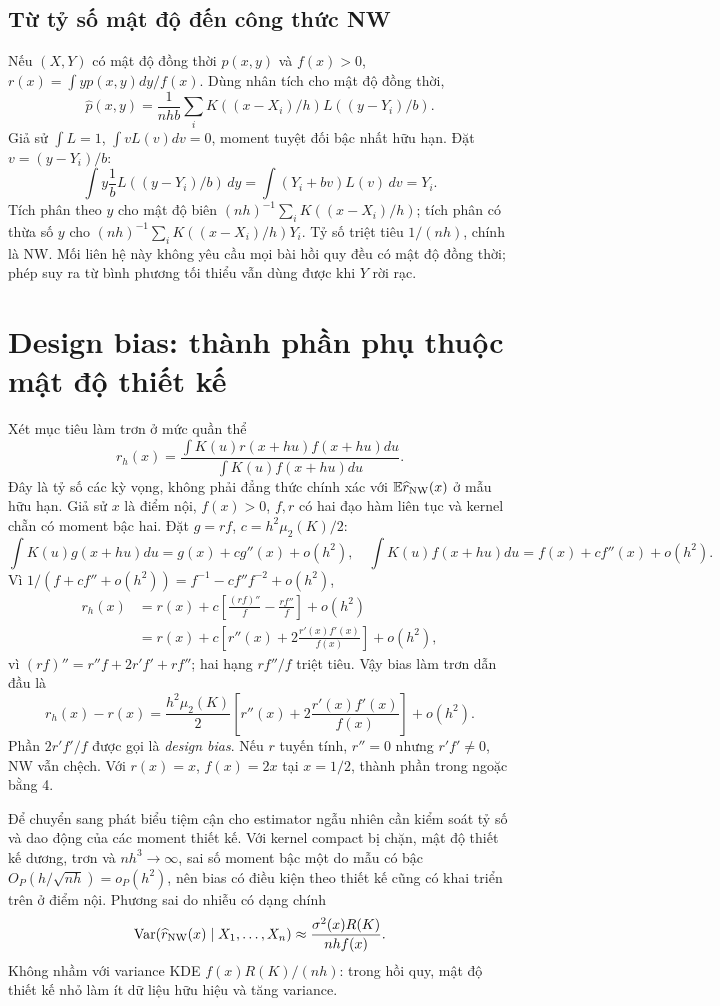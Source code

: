 \subsection{Từ tỷ số mật độ đến công thức NW}
Nếu $(X,Y)$ có mật độ đồng thời $p(x,y)$ và $f(x)>0$,
$r(x)=\int yp(x,y)dy/f(x)$.
Dùng nhân tích cho mật độ đồng thời,
\[
\widehat p(x,y)=\frac1{nhb}\sum_iK((x-X_i)/h)L((y-Y_i)/b).
\]
Giả sử $\int L=1$, $\int vL(v)dv=0$, moment tuyệt đối bậc nhất hữu hạn.
Đặt $v=(y-Y_i)/b$:
\[
\int y\frac1bL((y-Y_i)/b)\,dy
=\int(Y_i+bv)L(v)\,dv=Y_i.
\]
Tích phân theo $y$ cho mật độ biên
$(nh)^{-1}\sum_iK((x-X_i)/h)$; tích phân có thừa số $y$ cho
$(nh)^{-1}\sum_iK((x-X_i)/h)Y_i$. Tỷ số triệt tiêu $1/(nh)$, chính
là NW. Mối liên hệ này không yêu cầu mọi bài hồi quy đều có mật độ
đồng thời; phép suy ra từ bình phương tối thiểu vẫn dùng được khi $Y$ rời rạc.

\section{Design bias: thành phần phụ thuộc mật độ thiết kế}
Xét mục tiêu làm trơn ở mức quần thể
\[
r_h(x)=\frac{\int K(u)r(x+hu)f(x+hu)du}
{\int K(u)f(x+hu)du}.
\]
Đây là tỷ số các kỳ vọng, không phải đẳng thức chính xác với
$\mathbb E\widehat r_{\rm NW}(x)$ ở mẫu hữu hạn.
Giả sử $x$ là điểm nội, $f(x)>0$, $f,r$ có hai đạo hàm liên tục và
kernel chẵn có moment bậc hai. Đặt $g=rf$, $c=h^2\mu_2(K)/2$:
\[
\int K(u)g(x+hu)du=g(x)+cg''(x)+o(h^2),\quad
\int K(u)f(x+hu)du=f(x)+cf''(x)+o(h^2).
\]
Vì $1/(f+c f''+o(h^2))=f^{-1}-cf''f^{-2}+o(h^2)$,
\begin{align*}
r_h(x)&=r(x)+c\left[\frac{(rf)''}{f}-\frac{r f''}{f}\right]+o(h^2)\\
&=r(x)+c\left[r''(x)+2\frac{r'(x)f'(x)}{f(x)}\right]+o(h^2),
\end{align*}
vì $(rf)''=r''f+2r'f'+rf''$; hai hạng $rf''/f$ triệt tiêu.
Vậy bias làm trơn dẫn đầu là
\[
\boxed{r_h(x)-r(x)=\frac{h^2\mu_2(K)}2
\left[r''(x)+2\frac{r'(x)f'(x)}{f(x)}\right]+o(h^2).}
\]
Phần $2r'f'/f$ được gọi là \emph{design bias}.
Nếu $r$ tuyến tính, $r''=0$ nhưng $r'f'\ne0$, NW vẫn chệch.
Với $r(x)=x$, $f(x)=2x$ tại $x=1/2$, thành phần trong ngoặc bằng 4.

Để chuyển sang phát biểu tiệm cận cho estimator ngẫu nhiên cần kiểm soát
tỷ số và dao động của các moment thiết kế. Với kernel compact bị chặn,
mật độ thiết kế dương, trơn và $nh^3\to\infty$, sai số moment bậc một
do mẫu có bậc $O_P(h/\sqrt{nh})=o_P(h^2)$, nên bias có điều kiện
theo thiết kế cũng có khai triển trên ở điểm nội.
Phương sai do nhiễu có dạng chính
\[
\operatorname{Var}(\widehat r_{\rm NW}(x)\mid X_1,\ldots,X_n)
\approx\frac{\sigma^2(x)R(K)}{nhf(x)}.
\]
Không nhầm với variance KDE $f(x)R(K)/(nh)$:
trong hồi quy, mật độ thiết kế nhỏ làm ít dữ liệu hữu hiệu và tăng variance.

